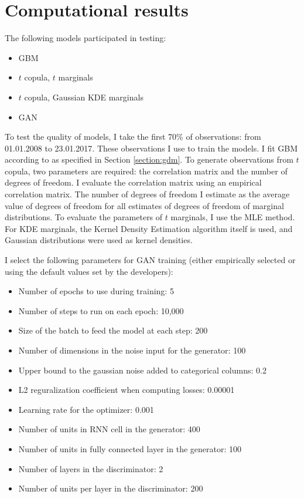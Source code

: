 \documentclass{article}
\begin{document}
\section{Computational results}
\label{section:results}
The following models participated in testing:
\begin{itemize}
    \item GBM
    \item $t$ copula, $t$ marginals
    \item $t$ copula, Gaussian KDE marginals
    \item GAN
\end{itemize}

To test the quality of models, I take the first 70\% of observations: from 01.01.2008 to 23.01.2017. These observations I use to train the models. I fit GBM according to as specified in Section \ref{section:gdm}. To generate observations from $t$ copula, two parameters are required: the correlation matrix and the number of degrees of freedom. I evaluate the correlation matrix using an empirical correlation matrix. The number of degrees of freedom I estimate as the average value of degrees of freedom for all estimates of degrees of freedom of marginal distributions. To evaluate the parameters of $t$ marginals, I use the MLE method. For KDE marginals, the Kernel Density Estimation algorithm itself is used, and Gaussian distributions were used as kernel densities.

I select the following parameters for GAN training (either empirically selected or using the default values set by the developers):
\begin{itemize}
    \item Number of epochs to use during training: 5
    \item Number of steps to run on each epoch: 10,000
    \item Size of the batch to feed the model at each step: 200
    \item Number of dimensions in the noise input for the generator: 100
    \item Upper bound to the gaussian noise added to categorical columns: 0.2
    \item L2 reguralization coefficient when computing losses: 0.00001
    \item Learning rate for the optimizer: 0.001
    \item Number of units in RNN cell in the generator: 400
    \item Number of units in fully connected layer in the generator: 100
    \item Number of layers in the discriminator: 2
    \item Number of units per layer in the discriminator: 200
\end{itemize}
\end{document}

